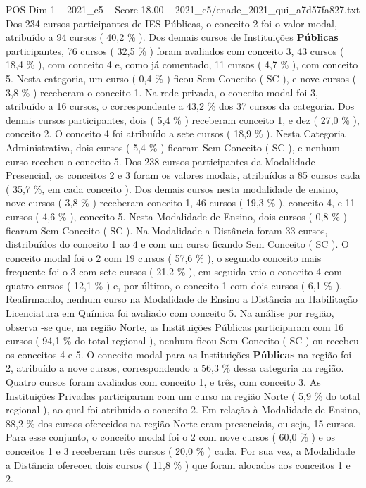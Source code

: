 \begin{textsample}{POS Dim 1 – 2021\_c5 – Score 18.00 – 2021\_c5/enade\_2021\_qui\_a7d57fa827.txt}
Dos 234 cursos participantes de IES Públicas, o conceito 2 foi o valor modal, atribuído a 94 cursos ( 40,2 \% ).
Dos demais cursos de Instituições \textbf{Públicas} participantes, 76 cursos ( 32,5 \% ) foram avaliados com conceito 3, 43 cursos ( 18,4 \% ), com conceito 4 e, como já comentado, 11 cursos ( 4,7 \% ), com conceito 5.
Nesta categoria, um curso ( 0,4 \% ) ficou Sem Conceito ( SC ), e nove cursos ( 3,8 \% ) receberam o conceito 1.
Na rede privada, o conceito modal foi 3, atribuído a 16 cursos, o correspondente a 43,2 \% dos 37 cursos da categoria.
Dos demais cursos participantes, dois ( 5,4 \% ) receberam conceito 1, e dez ( 27,0 \% ), conceito 2.
O conceito 4 foi atribuído a sete cursos ( 18,9 \% ).
Nesta Categoria Administrativa, dois cursos ( 5,4 \% ) ficaram Sem Conceito ( SC ), e nenhum curso recebeu o conceito 5.
Dos 238 cursos participantes da Modalidade Presencial, os conceitos 2 e 3 foram os valores modais, atribuídos a 85 cursos cada ( 35,7 \%, em cada conceito ).
Dos demais cursos nesta modalidade de ensino, nove cursos ( 3,8 \% ) receberam conceito 1, 46 cursos ( 19,3 \% ), conceito 4, e 11 cursos ( 4,6 \% ), conceito 5.
Nesta Modalidade de Ensino, dois cursos ( 0,8 \% ) ficaram Sem Conceito ( SC ).
Na Modalidade a Distância foram 33 cursos, distribuídos do conceito 1 ao 4 e com um curso ficando Sem Conceito ( SC ).
O conceito modal foi o 2 com 19 cursos ( 57,6 \% ), o segundo conceito mais frequente foi o 3 com sete cursos ( 21,2 \% ), em seguida veio o conceito 4 com quatro cursos ( 12,1 \% ) e, por último, o conceito 1 com dois cursos ( 6,1 \% ).
Reafirmando, nenhum curso na Modalidade de Ensino a Distância na Habilitação Licenciatura em Química foi avaliado com conceito 5.
Na análise por região, observa -se que, na região Norte, as Instituições Públicas participaram com 16 cursos ( 94,1 \% do total regional ), nenhum ficou Sem Conceito ( SC ) ou recebeu os conceitos 4 e 5.
O conceito modal para as Instituições \textbf{Públicas} na região foi 2, atribuído a nove cursos, correspondendo a 56,3 \% dessa categoria na região.
Quatro cursos foram avaliados com conceito 1, e três, com conceito 3.
As Instituições Privadas participaram com um curso na região Norte ( 5,9 \% do total regional ), ao qual foi atribuído o conceito 2.
Em relação à Modalidade de Ensino, 88,2 \% dos cursos oferecidos na região Norte eram presenciais, ou seja, 15 cursos.
Para esse conjunto, o conceito modal foi o 2 com nove cursos ( 60,0 \% ) e os conceitos 1 e 3 receberam três cursos ( 20,0 \% ) cada.
Por sua vez, a Modalidade a Distância ofereceu dois cursos ( 11,8 \% ) que foram alocados aos conceitos 1 e 2.

\end{textsample}
